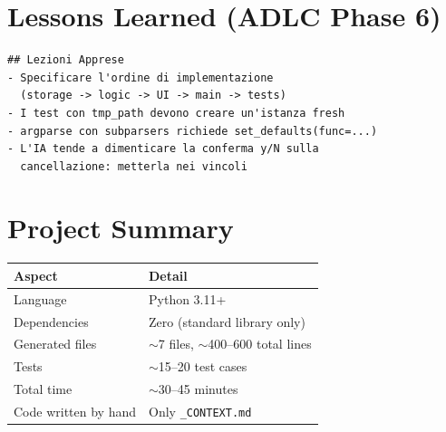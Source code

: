 \section{Lessons Learned (ADLC Phase 6)}

\begin{lstlisting}[language={},title={Lessons to add to the context}]
## Lezioni Apprese
- Specificare l'ordine di implementazione
  (storage -> logic -> UI -> main -> tests)
- I test con tmp_path devono creare un'istanza fresh
- argparse con subparsers richiede set_defaults(func=...)
- L'IA tende a dimenticare la conferma y/N sulla
  cancellazione: metterla nei vincoli
\end{lstlisting}

\section*{Project Summary}

\begin{center}
\begin{tabularx}{\textwidth}{l X}
\toprule
\textbf{Aspect} & \textbf{Detail} \\
\midrule
Language & Python 3.11+ \\
Dependencies & Zero (standard library only) \\
Generated files & $\sim$7 files, $\sim$400--600 total lines \\
Tests & $\sim$15--20 test cases \\
Total time & $\sim$30--45 minutes \\
Code written by hand & Only \texttt{\_CONTEXT.md} \\
\bottomrule
\end{tabularx}
\end{center}
